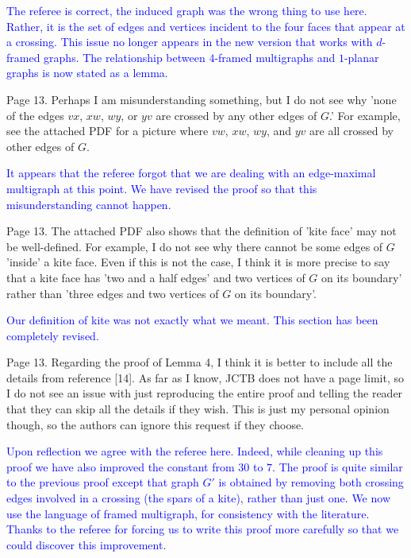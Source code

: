 \documentclass[12pt]{article}
\begin{document}
\textcolor{blue}{The referee is correct, the induced graph was the wrong thing to use here.  Rather, it is the set of edges and vertices incident to the four faces that appear at a crossing.  This issue no longer appears in the new version that works with $d$-framed graphs.  The relationship between $4$-framed multigraphs and $1$-planar graphs is now stated as a lemma.}

Page 13. Perhaps I am misunderstanding something, but I do not see why
'none of the edges $vx$, $xw$, $wy$, or $yv$ are crossed by any other edges of
$G$.'  For example, see the attached PDF for a picture where $vw$, $xw$, $wy$,
and $yv$ are all crossed by other edges of $G$.

\textcolor{blue}{It appears that the referee forgot that we are dealing with an edge-maximal multigraph at this point. We have revised the proof so that this misunderstanding cannot happen.}


Page 13. The attached PDF also shows that the definition of 'kite
face' may not be well-defined.  For example, I do not see why there
cannot be some edges of $G$ 'inside' a kite face.  Even if this is not
the case, I think it is more precise to say that a kite face has 'two
and a half edges' and two vertices of $G$ on its boundary' rather than
'three edges and two vertices of $G$ on its boundary'.

\textcolor{blue}{Our definition of kite was not exactly what we meant. This section has been completely revised.}

Page 13.  Regarding the proof of Lemma 4, I think it is better to
include all the details from reference [14].  As far as I know, JCTB
does not have a page limit, so I do not see an issue with just
reproducing the entire proof and telling the reader that they can skip
all the details if they wish.  This is just my personal opinion
though, so the authors can ignore this request if they choose.

\textcolor{blue}{Upon reflection we agree with the referee here. Indeed, while cleaning up this proof we have also improved the constant from $30$ to $7$. The proof is quite similar to the previous proof except that graph $G'$ is obtained by removing both crossing edges involved in a crossing (the spars of a kite), rather than just one.  We now use the language of framed multigraph, for consistency with the literature. Thanks to the referee for forcing us to write this proof more carefully so that we could discover this improvement.}
\end{document}
